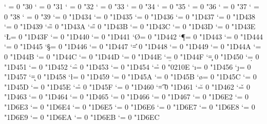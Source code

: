 \Umathcode `\0 = 0 \alphafam "30
\Umathcode `\1 = 0 \alphafam "31
\Umathcode `\2 = 0 \alphafam "32
\Umathcode `\3 = 0 \alphafam "33
\Umathcode `\4 = 0 \alphafam "34
\Umathcode `\5 = 0 \alphafam "35
\Umathcode `\6 = 0 \alphafam "36
\Umathcode `\7 = 0 \alphafam "37
\Umathcode `\8 = 0 \alphafam "38
\Umathcode `\9 = 0 \alphafam "39
\Umathcode `\A = 0 \alphafam "1D434
\Umathcode `\B = 0 \alphafam "1D435
\Umathcode `\C = 0 \alphafam "1D436
\Umathcode `\D = 0 \alphafam "1D437
\Umathcode `\E = 0 \alphafam "1D438
\Umathcode `\F = 0 \alphafam "1D439
\Umathcode `\G = 0 \alphafam "1D43A
\Umathcode `\H = 0 \alphafam "1D43B
\Umathcode `\I = 0 \alphafam "1D43C
\Umathcode `\J = 0 \alphafam "1D43D
\Umathcode `\K = 0 \alphafam "1D43E
\Umathcode `\L = 0 \alphafam "1D43F
\Umathcode `\M = 0 \alphafam "1D440
\Umathcode `\N = 0 \alphafam "1D441
\Umathcode `\O = 0 \alphafam "1D442
\Umathcode `\P = 0 \alphafam "1D443
\Umathcode `\Q = 0 \alphafam "1D444
\Umathcode `\R = 0 \alphafam "1D445
\Umathcode `\S = 0 \alphafam "1D446
\Umathcode `\T = 0 \alphafam "1D447
\Umathcode `\U = 0 \alphafam "1D448
\Umathcode `\V = 0 \alphafam "1D449
\Umathcode `\W = 0 \alphafam "1D44A
\Umathcode `\X = 0 \alphafam "1D44B
\Umathcode `\Y = 0 \alphafam "1D44C
\Umathcode `\Z = 0 \alphafam "1D44D
\Umathcode `\a = 0 \alphafam "1D44E
\Umathcode `\b = 0 \alphafam "1D44F
\Umathcode `\c = 0 \alphafam "1D450
\Umathcode `\d = 0 \alphafam "1D451
\Umathcode `\e = 0 \alphafam "1D452
\Umathcode `\f = 0 \alphafam "1D453
\Umathcode `\g = 0 \alphafam "1D454
\Umathcode `\h = 0 \alphafam "0210E %
\Umathcode `\i = 0 \alphafam "1D456
\Umathcode `\j = 0 \alphafam "1D457
\Umathcode `\k = 0 \alphafam "1D458
\Umathcode `\l = 0 \alphafam "1D459
\Umathcode `\m = 0 \alphafam "1D45A
\Umathcode `\n = 0 \alphafam "1D45B
\Umathcode `\o = 0 \alphafam "1D45C
\Umathcode `\p = 0 \alphafam "1D45D
\Umathcode `\q = 0 \alphafam "1D45E
\Umathcode `\r = 0 \alphafam "1D45F
\Umathcode `\s = 0 \alphafam "1D460
\Umathcode `\t = 0 \alphafam "1D461
\Umathcode `\u = 0 \alphafam "1D462
\Umathcode `\v = 0 \alphafam "1D463
\Umathcode `\w = 0 \alphafam "1D464
\Umathcode `\x = 0 \alphafam "1D465
\Umathcode `\y = 0 \alphafam "1D466
\Umathcode `\z = 0 \alphafam "1D467
\Umathcode `\Α = 0 \alphafam "1D6E2
\Umathcode `\Β = 0 \alphafam "1D6E3
\Umathcode `\Γ = 0 \alphafam "1D6E4
\Umathcode `\Δ = 0 \alphafam "1D6E5
\Umathcode `\Ε = 0 \alphafam "1D6E6
\Umathcode `\Ζ = 0 \alphafam "1D6E7
\Umathcode `\Η = 0 \alphafam "1D6E8
\Umathcode `\Θ = 0 \alphafam "1D6E9
\Umathcode `\Ι = 0 \alphafam "1D6EA
\Umathcode `\Κ = 0 \alphafam "1D6EB
\Umathcode `\Λ = 0 \alphafam "1D6EC
